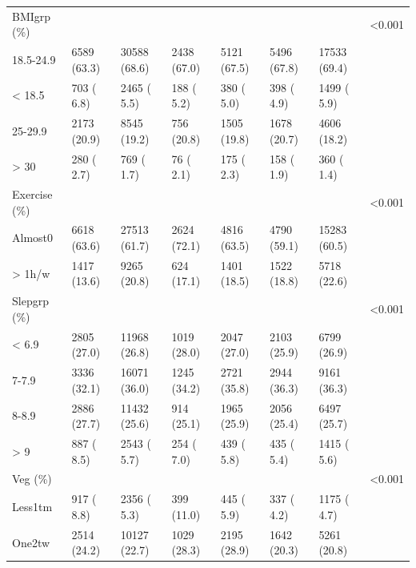 \documentclass[]{tufte-handout}
\begin{document}
\begin{table}[ht]
\begin{tabular}[t]{llllllll}
\rowcolor{gray!6}  BMIgrp (\%) &  &  &  &  &  &  & <0.001\\
\hspace{1em}18.5-24.9 & 6589 (63.3) & 30588 (68.6) & 2438 (67.0) & 5121 (67.5) & 5496 (67.8) & 17533 (69.4) & \\
\rowcolor{gray!6}  \hspace{1em}< 18.5 & 703 ( 6.8) & 2465 ( 5.5) & 188 ( 5.2) & 380 ( 5.0) & 398 ( 4.9) & 1499 ( 5.9) & \\
\hspace{1em}25-29.9 & 2173 (20.9) & 8545 (19.2) & 756 (20.8) & 1505 (19.8) & 1678 (20.7) & 4606 (18.2) & \\
\rowcolor{gray!6}  \hspace{1em}> 30 & 280 ( 2.7) & 769 ( 1.7) & 76 ( 2.1) & 175 ( 2.3) & 158 ( 1.9) & 360 ( 1.4) & \\
Exercise (\%) &  &  &  &  &  &  & <0.001\\
\rowcolor{gray!6}  \hspace{1em}Almost0 & 6618 (63.6) & 27513 (61.7) & 2624 (72.1) & 4816 (63.5) & 4790 (59.1) & 15283 (60.5) & \\
\hspace{1em}> 1h/w & 1417 (13.6) & 9265 (20.8) & 624 (17.1) & 1401 (18.5) & 1522 (18.8) & 5718 (22.6) & \\
\rowcolor{gray!6}  Slepgrp (\%) &  &  &  &  &  &  & <0.001\\
\hspace{1em}< 6.9 & 2805 (27.0) & 11968 (26.8) & 1019 (28.0) & 2047 (27.0) & 2103 (25.9) & 6799 (26.9) & \\
\rowcolor{gray!6}  \hspace{1em}7-7.9 & 3336 (32.1) & 16071 (36.0) & 1245 (34.2) & 2721 (35.8) & 2944 (36.3) & 9161 (36.3) & \\
\hspace{1em}8-8.9 & 2886 (27.7) & 11432 (25.6) & 914 (25.1) & 1965 (25.9) & 2056 (25.4) & 6497 (25.7) & \\
\rowcolor{gray!6}  \hspace{1em}> 9 & 887 ( 8.5) & 2543 ( 5.7) & 254 ( 7.0) & 439 ( 5.8) & 435 ( 5.4) & 1415 ( 5.6) & \\
Veg (\%) &  &  &  &  &  &  & <0.001\\
\rowcolor{gray!6}  \hspace{1em}Less1tm & 917 ( 8.8) & 2356 ( 5.3) & 399 (11.0) & 445 ( 5.9) & 337 ( 4.2) & 1175 ( 4.7) & \\
\hspace{1em}One2tw & 2514 (24.2) & 10127 (22.7) & 1029 (28.3) & 2195 (28.9) & 1642 (20.3) & 5261 (20.8) & \\

\end{tabular}
\end{table}
\end{document}
